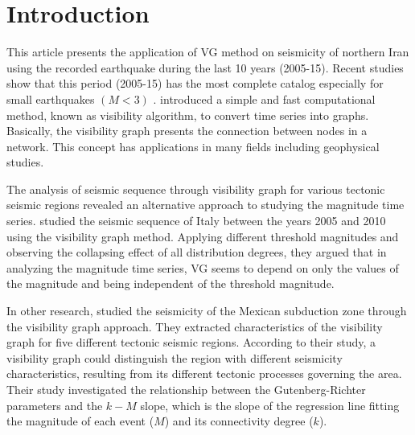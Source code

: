
\section{Introduction}

This article presents the application of VG method on seismicity of northern Iran using the recorded earthquake during the last 10 years (2005-15). Recent studies show that this period (2005-15) has the most complete catalog especially for small earthquakes $(M < 3)$ \citep[e.g.][]{Khoshnevis2016}.  \citet{Lacasa2008} introduced a simple and fast computational method, known as visibility algorithm, to convert time series into graphs. Basically, the visibility graph presents the connection between nodes in a network. This concept has applications in many fields including geophysical studies\citep[e.g.,][]{Telesca2012_CSF,Long2013,Wang2012}.

The analysis of seismic sequence through visibility graph for various tectonic seismic regions revealed an alternative approach to studying the magnitude time series. \citet{Telesca2012} studied the seismic sequence of Italy between the years 2005 and 2010 using the visibility graph method. Applying different threshold magnitudes and observing the collapsing effect of all distribution degrees, they argued that in analyzing the magnitude time series, VG seems to depend on only the values of the magnitude and being independent of the threshold magnitude. 

In other research, \citet{Telesca2013} studied the seismicity of the Mexican subduction zone through the visibility graph approach. They extracted characteristics of the visibility graph for five different tectonic seismic regions.  According to their study, a visibility graph could distinguish the region with different seismicity characteristics, resulting from its different tectonic processes governing the area. Their study investigated the relationship between the Gutenberg-Richter parameters and the $k-M$ slope, which is the slope of the regression line fitting the magnitude of each event ($M$) and its connectivity degree ($k$). 

